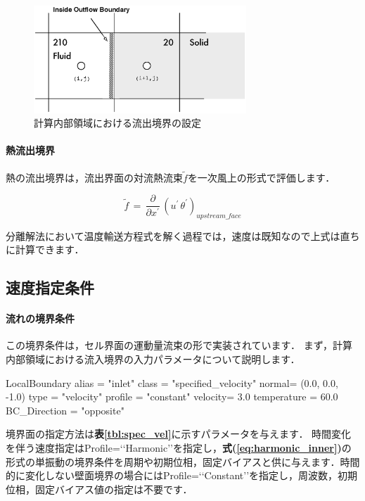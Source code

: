 \begin{figure}[htbp]
\begin{center}
\includegraphics[width=8cm,clip]{outflowBC_inner.eps}
\end{center}
\caption{計算内部領域における流出境界の設定}
\label{fig:outflow BC inner}
\end{figure}

%
\paragraph{熱流出境界}
熱の流出境界は，流出界面の対流熱流束$\tilde{f}$を一次風上の形式で評価します．

\begin{equation}
\tilde{f} \,=\, \frac{\partial}{\partial x^{\prime}}\, \left( u^{\prime}\,\theta^{\prime} \right)_{upstream\_face}
\label{eq:outflow heat flux}
\end{equation}

分離解法において温度輸送方程式を解く過程では，速度は既知なので上式は直ちに計算できます．


\subsection{速度指定条件}

\paragraph{流れの境界条件}
この境界条件は，セル界面の運動量流束の形で実装されています．
まず，計算内部領域における流入境界の入力パラメータについて説明します．

{\small
\begin{program}
LocalBoundary {
  alias = "inlet"
  class = "specified_velocity"
  normal= (0.0, 0.0, -1.0)
  type  = "velocity"
  profile = "constant"
  velocity= 3.0
  temperature = 60.0
  BC_Direction = "opposite"
}
\end{program}
}

\noindent 境界面の指定方法は\textbf{表\ref{tbl:spec_vel}}に示すパラメータを与えます．
時間変化を伴う速度指定はProfile=\lq\lq Harmonic\rq\rq を指定し，\textbf{式(\ref{eq:harmonic_inner})}の形式の単振動の境界条件を周期や初期位相，固定バイアスと供に与えます．時間的に変化しない壁面境界の場合にはProfile=\lq\lq Constant\rq\rq を指定し，周波数，初期位相，固定バイアス値の指定は不要です．

